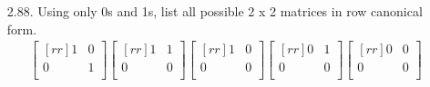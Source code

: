 \documentclass[12pt]{article}
\begin{document}
\begin{enumerate}
\item [2.88.] Using only 0s and 1s, list all possible 2 x 2 matrices in row canonical form.
\begin{align*}
\begin{bmatrix}[rr]
1 & 0\\
0 & 1\\
\end{bmatrix}
\begin{bmatrix}[rr]
1 & 1\\
0 & 0\\
\end{bmatrix}
\begin{bmatrix}[rr]
1 & 0\\
0 & 0\\
\end{bmatrix}
\begin{bmatrix}[rr]
0 & 1\\
0 & 0\\
\end{bmatrix}
\begin{bmatrix}[rr]
0 & 0\\
0 & 0\\
\end{bmatrix}
\end{align*}


\end{enumerate}
\end{document}
